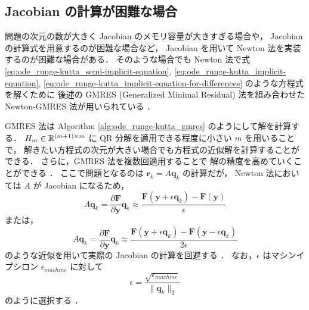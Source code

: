 \subsection{Jacobian の計算が困難な場合}\label{sec:ode_runge-kutta_without-jacobian}

問題の次元の数が大きく Jacobian のメモリ容量が大きすぎる場合や，
Jacobian の計算式を用意するのが困難な場合など，
Jacobian を用いて Newton 法を実装するのが困難な場合がある．
そのような場合でも Newton 法で式
\eqref{eq:ode_runge-kutta_semi-implicit-equation},
\eqref{eq:ode_runge-kutta_implicit-equation},
\eqref{eq:ode_runge-kutta_implicit-equation-for-differences}
のような方程式を解くために
後述の GMRES (Generalized Minimal Residual)  法を組み合わせた
Newton-GMRES 法が用いられている
\cite{Blom2016, Blom2013}．

GMRES 法は Algorithm \ref{alg:ode_runge-kutta_gmres} のようにして解を計算する．
$H_m \in \mathbb{R}^{(m + 1) \times m}$ に QR 分解を適用できる程度に小さい $m$ を用いることで，
解きたい方程式の次元が大きい場合でも方程式の近似解を計算することができる．
さらに，GMRES 法を複数回適用することで
解の精度を高めていくことができる
\cite{Golub2013,Blom2013}．
ここで問題となるのは $\bm{r}_k = A \bm{q}_k$ の計算だが，
Newton 法においては $A$ が Jacobian になるため，
\begin{equation}
    A \bm{q}_k
    =
    \frac{\partial \bm{F}}{\partial \bm{y}}
    \bm{q}_k
    \approx
    \frac{\bm{F}(\bm{y} + \epsilon \bm{q}_k) - \bm{F}(\bm{y})}{\epsilon}
\end{equation}
または，
\begin{equation}
    A \bm{q}_k
    =
    \frac{\partial \bm{F}}{\partial \bm{y}}
    \bm{q}_k
    \approx
    \frac{\bm{F}(\bm{y} + \epsilon \bm{q}_k) - \bm{F}(\bm{y} - \epsilon \bm{q}_k)}{2 \epsilon}
\end{equation}
のような近似を用いて実際の Jacobian の計算を回避する
\cite{Blom2016, Blom2013}．
なお，$\epsilon$ はマシンイプシロン $\epsilon_{machine}$ に対して
\begin{equation}
    \epsilon = \frac{\sqrt{\epsilon_{machine}}}{\|\bm{q}_k\|_2}
\end{equation}
のように選択する
\cite{Blom2016, Blom2013}．

